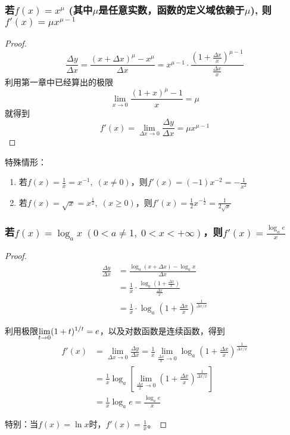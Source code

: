 \subsubsection{若$f(x)=x^{\mu}$ (其中$\mu$是任意实数，函数的定义域依赖于$\mu$), 则$f'(x)=\mu x^{\mu-1}$}

\begin{proof}
    \[\frac{\Delta y}{\Delta x}=\frac{(x+\Delta x)^{\mu}-x^{\mu}}{\Delta x}=x^{\mu-1}\cdot \frac{\left(1+\frac{\Delta x}{x}\right)^{\mu-1}}{\frac{\Delta x}{x}}\]
利用第一章中已经算出的极限
\[\lim_{x\to 0}\frac{(1+x)^{\mu}-1}{x}=\mu\]
就得到
\[f'(x)=\lim_{\Delta x\to 0}\frac{\Delta y}{\Delta x}=\mu x^{\mu-1}\]
\end{proof}

特殊情形：
\begin{enumerate}
    \item 若$f(x)=\frac{1}{x}=x^{-1},\; (x\ne 0)$，则$f'(x)=(-1)x^{-2}=-\frac{1}{x^2}$
    \item 若$f(x)=\sqrt{x}=x^{\tfrac{1}{2}},\; (x\ge 0)$，则$f'(x)=\frac{1}{2}x^{-\tfrac{1}{2}}=\frac{1}{2\sqrt{x}}$
\end{enumerate}

\subsubsection{若$f(x)=\log_a x\; (0<a\ne 1,\; 0<x<+\infty)$，则$f'(x)=\frac{\log_a e}{x}$}

\begin{proof}
\[\begin{split}
    \frac{\Delta y}{\Delta x}&=\frac{\log_a(x+\Delta x)-\log_a x}{\Delta x}\\
    &=\frac{1}{x}\cdot \frac{\log_a\left(1+\frac{\Delta x}{x}\right)}{\frac{\Delta x}{x}}\\
    &=\frac{1}{x}\cdot \log_a\left(1+\frac{\Delta x}{x}\right)^{\tfrac{1}{\Delta x/x}}
\end{split}\]  

利用极限$\displaystyle\lim_{t\to 0}(1+t)^{1/t}=e$，以及对数函数是连续函数，得到
\[\begin{split}
    f'(x)&=\lim_{\Delta x\to 0}\frac{\Delta y}{\Delta x}=\frac{1}{x}\lim_{\tfrac{\Delta x}{x}\to 0}\log_a\left(1+\frac{\Delta x}{x}\right)^{\tfrac{1}{\Delta x/x}}\\
    &=\frac{1}{x}\log_a\left[\lim_{\tfrac{\Delta x}{x}\to 0}\left(1+\frac{\Delta x}{x}\right)^{\tfrac{1}{\Delta x/x}}\right]\\
    &=\frac{1}{x}\log_a e=\frac{\log_a e}{x}
\end{split}\]

特别：当$f(x)=\ln x$时，$f'(x)=\frac{1}{x}$。
\end{proof}

